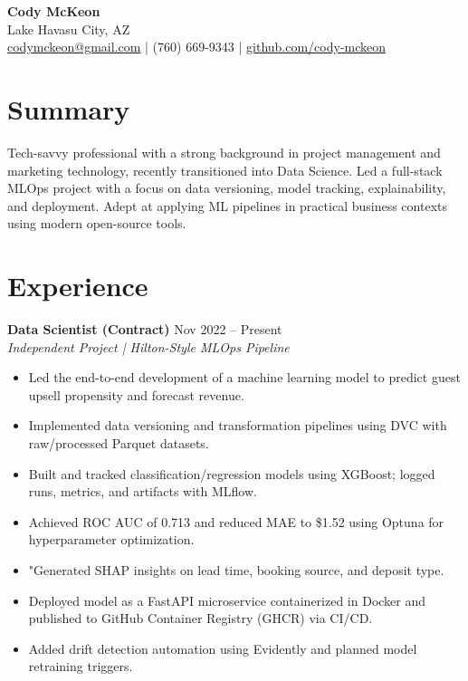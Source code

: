 \documentclass[a4paper,10pt]{article}
\begin{document}
\begin{center}
    {\LARGE \textbf{Cody McKeon}} \\
    \vspace{4pt}
    Lake Havasu City, AZ \\
    \href{mailto:codymckeon@gmail.com}{codymckeon@gmail.com} | (760) 669-9343 | \href{https://github.com/cody-mckeon}{github.com/cody-mckeon}
\end{center}

\vspace{8pt}

\section*{Summary}
Tech-savvy professional with a strong background in project management and marketing technology, recently transitioned into Data Science. Led a full-stack MLOps project with a focus on data versioning, model tracking, explainability, and deployment. Adept at applying ML pipelines in practical business contexts using modern open-source tools.

\section*{Experience}

\textbf{Data Scientist (Contract)} \hfill Nov 2022 -- Present \\
\textit{Independent Project | Hilton-Style MLOps Pipeline} \\
\begin{itemize}[leftmargin=*, itemsep=2pt, parsep=0pt]
    \item Led the end-to-end development of a machine learning model to predict guest upsell propensity and forecast revenue.
    \item Implemented data versioning and transformation pipelines using DVC with raw/processed Parquet datasets.
    \item Built and tracked classification/regression models using XGBoost; logged runs, metrics, and artifacts with MLflow.
    \item Achieved ROC AUC of 0.713 and reduced MAE to \$1.52 using Optuna for hyperparameter optimization.
    \item "Generated SHAP insights on lead time, booking source, and deposit type.
    \item Deployed model as a FastAPI microservice containerized in Docker and published to GitHub Container Registry (GHCR) via CI/CD.
    \item Added drift detection automation using Evidently and planned model retraining triggers.
\end{itemize}
\end{document}
